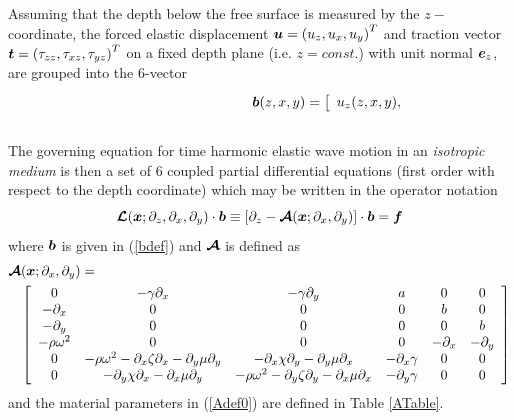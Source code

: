 \documentclass[11pt]{article}
\newcommand{\CB}[1]{\mbox{\boldmath$\cal #1$\unboldmath}}
\newcommand{\bmi}[1]{\mbox{\boldmath$\mit #1$\unboldmath}}
\begin{document}
Assuming that the depth below the free surface is measured by the
$z-$coordinate, the forced elastic displacement ${\bmi  u} = {({u}_{z},{u}_{x},{u}_{y})}^{T}$
and traction vector ${\bmi  t} = {({\tau}_{zz},{\tau}_{xz},{\tau}_{yz})}^{T }$ on a
fixed depth plane (i.e. $z=const.$) with unit
normal ${\bmi  e}_{z}$,  are grouped into the $6$-vector
\begin{eqnarray} \label{bdef}
\lefteqn{{\bmi  b}  (z,x,y)= {  \left[ \begin{array}{cccccc}{ u}_{ z}
(z,x,y),&{u}_{x}(z,x,y),&{u}_{y}(z,x,y),&{\tau}_{zz}(z,x,y),&{\tau}_{xz}(z,x,y),&
{\tau}_{yz}(z,x,y)\end{array} \right]}^{  T }.}\nonumber\\
&&
\end{eqnarray}
The governing equation for time harmonic elastic wave motion in an {\em isotropic  medium\/}
is then a
set of $6$ coupled partial differential equations (first order with respect
to the depth coordinate) which may be written in the operator notation
\begin{equation} \label{govEqn00}
{\CB L}({\bmi x};{\partial }_{z},{\partial }_{x},{\partial }_{y})\cdot {\bmi  b }\equiv\left[\partial_{z}-{\CB A}({\bmi x};{\partial }_{x},{\partial }_{y})\right]\cdot {\bmi  b }=
{\bmi  f}
\end{equation}
where ${\bmi  b}$ is given in (\ref{bdef})  and
${\CB A}$ is defined as
\begin{eqnarray} \label{Adef0}
\lefteqn{{\CB A}({\bmi x};{\partial }_{x},{\partial }_{y})=}\nonumber\\
&&\left[{\begin{array}{cccccc}
0&- \gamma {\partial }_{  x}&  - \gamma {\partial }_{  y}&  a&0&0\\
-{ \partial }_{x}&0&0&0&b&0\\
-{\partial }_{y}&0&0&0&0&b\\
- \rho {\omega }^{  2}&  0&0&0&-{ \partial }_{x}&-{ \partial }_{y}\\
0&- \rho {\omega }^{  2}  -{\partial }_{x} \zeta {\partial }_{  x}  -{ \partial }_{y} \mu
{\partial }_{  y}&  -{ \partial }_{x} \chi {\partial }_{  y}
 -{ \partial }_{y} \mu {\partial }_{  x}&  -{ \partial }_{x} \gamma &  0&0\\
 0&-{ \partial }_{y} \chi {\partial }_{  x}  -{ \partial }_{x} \mu {\partial }_{  y}&
   - \rho {\omega }^{  2}  -{ \partial }_{y} \zeta {\partial }_{  y}
 -{ \partial }_{x} \mu {\partial }_{  x}&  -{ \partial }_{y} \gamma &  0&0\end{array}}
 \right]
\end{eqnarray}
and the material parameters in (\ref{Adef0}) are defined in Table \ref{ATable}.
\end{document}
